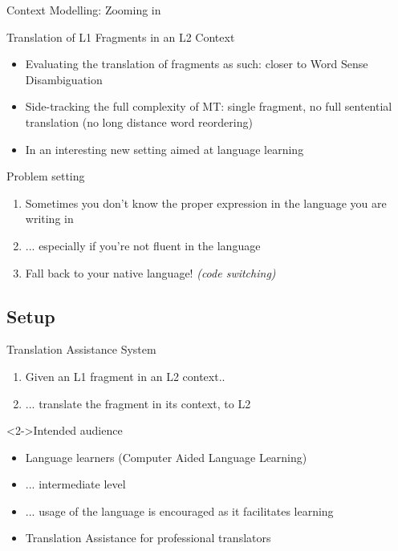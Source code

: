 \documentclass[compress]{beamer}
\begin{document}
\begin{frame}{Context Modelling: Zooming in}

  \begin{block}{Translation of L1 Fragments in an L2 Context}
    \begin{itemize}
      \item Evaluating the translation of fragments as such: closer to Word
        Sense Disambiguation
      \item Side-tracking the full complexity of MT: single fragment,  no full sentential
        translation (no long distance word reordering)
      \item In an interesting new setting aimed at language learning
    \end{itemize}
  \end{block}


  \begin{block}{Problem setting}
    \begin{enumerate}[<+->]
      \item Sometimes you don't know the proper expression in the language you
      are writing in
      \item ... especially if you're not fluent in the language
      \item Fall back to your native language! \emph{(code switching)}
    \end{enumerate}
  \end{block}

\end{frame}

\subsection{Setup}
\begin{frame}

  \begin{block}{Translation Assistance System}
    \begin{enumerate}
      \item Given an L1 fragment in an L2 context..
      \item ... translate the fragment in its context, to L2
    \end{enumerate}
  \end{block}

  \begin{block}<2->{Intended audience}
    \begin{itemize}
      \item<2-> Language learners (Computer Aided Language Learning)
      \item<2-> ...  intermediate level
      \item<2-> ...  usage of the language is encouraged as it facilitates learning
      \item<2-> Translation Assistance for professional translators
    \end{itemize}
  \end{block}


\end{frame}
\end{document}
